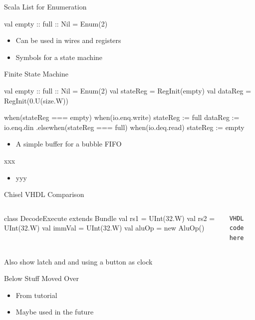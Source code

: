 \begin{frame}[fragile]{Scala List for Enumeration}
\begin{chisel}
  val empty :: full :: Nil = Enum(2)
\end{chisel}
\begin{itemize}
\item Can be used in wires and registers
\item Symbols for a state machine
\end{itemize}
\end{frame}

\begin{frame}[fragile]{Finite State Machine}
\begin{chisel}
  val empty :: full :: Nil = Enum(2)
  val stateReg = RegInit(empty)
  val dataReg = RegInit(0.U(size.W))

  when(stateReg === empty) {
    when(io.enq.write) {
      stateReg := full
      dataReg := io.enq.din
    }
  }.elsewhen(stateReg === full) {
    when(io.deq.read) {
      stateReg := empty
    }
  }
\end{chisel}
\begin{itemize}
\item A simple buffer for a bubble FIFO
\end{itemize}
\end{frame}


\begin{frame}[fragile]{xxx}
\begin{itemize}
\item yyy
\end{itemize}
\end{frame}


\begin{frame}[fragile]{Chisel VHDL Comparison}
\begin{columns}
\begin{chisel}
class DecodeExecute extends Bundle {
  val rs1 = UInt(32.W)
  val rs2 = UInt(32.W)
  val immVal = UInt(32.W)
  val aluOp = new AluOp()
}
\end{chisel}
\begin{verbatim}
VHDL code here
\end{verbatim}
\end{columns}
Also show latch and and using a button as clock
\end{frame}

\begin{frame}[fragile]{Below Stuff Moved Over}
\begin{itemize}
\item From tutorial
\item Maybe used in the future
\end{itemize}
\end{frame}

